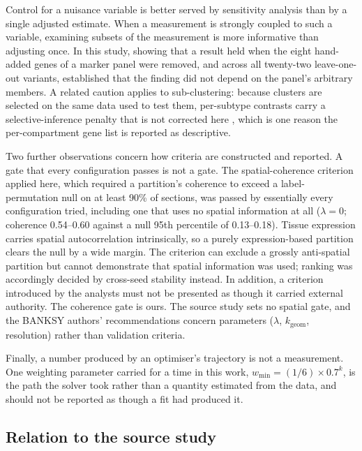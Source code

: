 Control for a nuisance variable is better served by sensitivity analysis than by a single
adjusted estimate. When a measurement is strongly coupled to such a variable, examining
subsets of the measurement is more informative than adjusting once. In this study, showing
that a result held when the eight hand-added genes of a marker panel were removed, and
across all twenty-two leave-one-out variants, established that the finding did not depend on
the panel's arbitrary members. A related caution applies to sub-clustering: because clusters
are selected on the same data used to test them, per-subtype contrasts carry a
selective-inference penalty that is not corrected here \citep{gao2024selective}, which is
one reason the per-compartment gene list is reported as descriptive.

Two further observations concern how criteria are constructed and reported. A gate that
every configuration passes is not a gate. The spatial-coherence criterion applied here,
which required a partition's coherence to exceed a label-permutation null on at least 90\%
of sections, was passed by essentially every configuration tried, including one that uses no
spatial information at all ($\lambda=0$; coherence 0.54--0.60 against a null 95th percentile
of 0.13--0.18). Tissue expression carries spatial autocorrelation intrinsically, so a purely
expression-based partition clears the null by a wide margin. The criterion can exclude a
grossly anti-spatial partition but cannot demonstrate that spatial information was used;
ranking was accordingly decided by cross-seed stability instead. In addition, a criterion
introduced by the analysts must not be presented as though it carried external authority.
The coherence gate is ours. The source study sets no spatial gate, and the BANKSY authors'
recommendations \citep{singhal2024banksy} concern parameters ($\lambda$, $k_{\text{geom}}$,
resolution) rather than validation criteria.

Finally, a number produced by an optimiser's trajectory is not a measurement. One weighting
parameter carried for a time in this work, $w_{\min}=(1/6)\times0.7^{k}$, is the path the
solver took rather than a quantity estimated from the data, and should not be reported as
though a fit had produced it.

\subsection{Relation to the source study}


